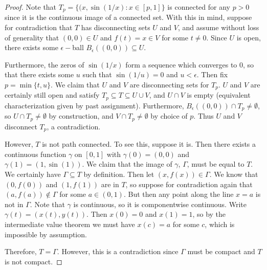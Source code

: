 \documentclass[12pt, a4paper]{book}
\theoremstyle{nonumberplain}
\newtheorem{proof}{Proof}
\begin{document}
\begin{proof}
    Note that $T_p=\{(x,\sin(1/x):x\in[p,1]\}$ is connected for any $p>0$ since it is the continuous image
    of a connected set. With this in mind, suppose for contradiction that $T$ has disconnecting sets
    $U$ and $V$, and assume without loss of generality that $(0,0)\in U$ and $f(t)=x\in V$ for some $t\neq 0$.
    Since $U$ is open, there exists some $\epsilon-$ball $B_\epsilon\left( (0,0) \right)\subseteq U$.

    Furthermore, the zeros of $\sin(1/x)$ form a sequence which converges to 0, so that there exists some
    $u$ such that $\sin(1/u)=0$ and $u<\epsilon$. Then fix $p=\min\{t,u\}$. We claim that $U$ and $V$ are
    disconnecting sets for $T_p$. $U$ and $V$ are certainly still
    open and satisfy $T_p\subseteq T\subseteq U\cup V$, and $U\cap V$ is empty (equivalent characterization
    given by past assignment). Furthermore, $B_\epsilon\left( (0,0) \right)\cap T_p\neq\emptyset$,
    so $U\cap T_p\neq\emptyset$ by construction, and $V\cap T_p\neq\emptyset$ by choice of $p$. Thus $U$ and
    $V$ disconnect $T_p$, a contradiction.

    However, $T$ is not path connected. To see this, suppose it is. Then there exists a continuous function
    $\gamma$ on $[0,1]$ with $\gamma(0)=(0,0)$ and $\gamma(1)=(1,\sin(1))$. We claim that the image
    of $\gamma$, $\Gamma$, must be equal to $T$. We certainly have $\Gamma\subseteq T$ by definition. Then
    let $(x,f(x))\in\Gamma$. We know that $(0,f(0))$ and $(1,f(1))$ are in $T$, so suppose
    for contradiction again that $(a,f(a))\notin \Gamma$ for some $a\in(0,1)$. But then any point along the
    line $x=a$ is not in $\Gamma$. Note that $\gamma$ is continuous, so it is componentwise continuous. Write
    $\gamma(t) = (x(t),y(t))$. Then $x(0)=0$ and $x(1)=1$, so by the intermediate value theorem we must have
    $x(c)=a$ for some $c$, which is impossible by assumption.

    Therefore, $T=\Gamma$. However, this is a contradiction since $\Gamma$ must be compact and $T$ is not compact.
\end{proof}
\end{document}
